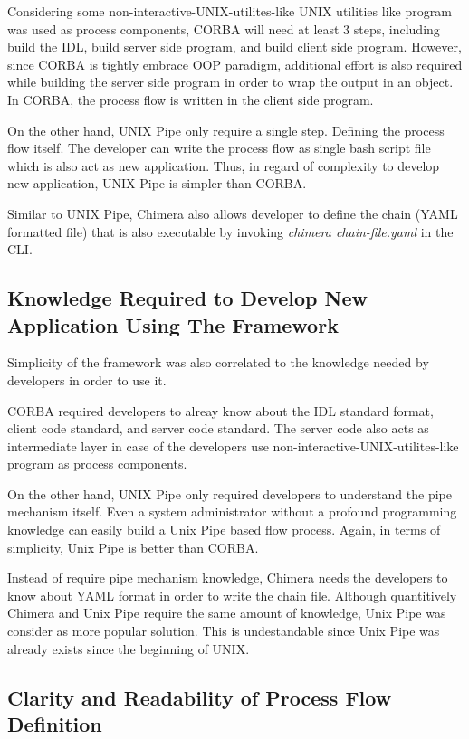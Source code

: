 \documentclass[conference]{IEEEtran}
\begin{document}
Considering some non-interactive-UNIX-utilites-like UNIX utilities like program was used as 
process components, CORBA will need at least 3 steps, including build the IDL, build server 
side program, and build client side program. However, since CORBA is tightly embrace OOP paradigm, 
additional effort is also required while building the server side program in order to wrap 
the output in an object. In CORBA, the process flow is written in the client side program.

On the other hand, UNIX Pipe only require a single step. Defining the process flow itself.
The developer can write the process flow as single bash script file which is also act as
new application. Thus, in regard of complexity to develop new application, UNIX Pipe is 
simpler than CORBA.

Similar to UNIX Pipe, Chimera also allows developer to define the chain (YAML formatted file)
that is also executable by invoking {\it chimera chain-file.yaml} in the CLI.


\subsection{Knowledge Required to Develop New Application Using The Framework}

Simplicity of the framework was also correlated to the knowledge needed by developers in order 
to use it. 

CORBA required developers to alreay know about the IDL standard format, client code standard, and
server code standard. The server code also acts as intermediate layer in case of the developers
use non-interactive-UNIX-utilites-like program as process components.

On the other hand, UNIX Pipe only required developers to understand the pipe mechanism itself.
Even a system administrator without a profound programming knowledge can easily build a Unix Pipe
based flow process. Again, in terms of simplicity, Unix Pipe is better than CORBA.

Instead of require pipe mechanism knowledge, Chimera needs the developers to know about YAML format 
in order to write the chain file. Although quantitively Chimera and Unix Pipe require the same amount
of knowledge, Unix Pipe was consider as more popular solution. This is undestandable since Unix Pipe was
already exists since the beginning of UNIX. 


\subsection{Clarity and Readability of Process Flow Definition}
\end{document}
